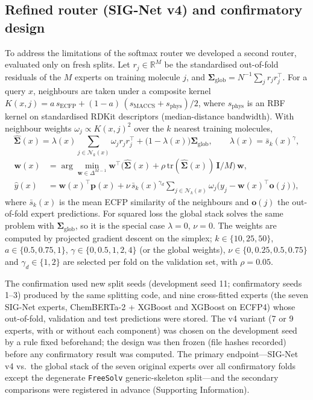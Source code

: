 \documentclass[journal=jcisd8,manuscript=article]{achemso}
\begin{document}
\subsection{Refined router (SIG-Net v4) and confirmatory design}
To address the limitations of the softmax router we developed a second router, evaluated only on fresh splits. Let $r_j \in \mathbb{R}^M$ be the standardised out-of-fold residuals of the $M$ experts on training molecule $j$, and $\boldsymbol{\Sigma}_{\mathrm{glob}} = N^{-1}\sum_j r_j r_j^\top$. For a query $x$, neighbours are taken under a composite kernel $K(x,j) = a\,s_{\mathrm{ECFP}} + (1-a)\,(s_{\mathrm{MACCS}} + s_{\mathrm{phys}})/2$, where $s_{\mathrm{phys}}$ is an RBF kernel on standardised RDKit descriptors (median-distance bandwidth). With neighbour weights $\omega_j \propto K(x,j)^2$ over the $k$ nearest training molecules,
\begin{equation}
\hat{\boldsymbol{\Sigma}}(x) = \lambda(x)\sum_{j \in \mathcal{N}_k(x)} \omega_j r_j r_j^\top + \bigl(1-\lambda(x)\bigr)\boldsymbol{\Sigma}_{\mathrm{glob}}, \qquad \lambda(x) = \bar{s}_k(x)^{\gamma},
\end{equation}
\begin{equation}
\begin{aligned}
\mathbf{w}(x) &= \arg\min_{\mathbf{w} \in \Delta^{M-1}} \mathbf{w}^\top \bigl(\hat{\boldsymbol{\Sigma}}(x) + \rho\,\mathrm{tr}(\hat{\boldsymbol{\Sigma}}(x))\,\mathbf{I}/M\bigr)\,\mathbf{w}, \\
\hat{y}(x) &= \mathbf{w}(x)^\top \mathbf{p}(x) + \nu\,\bar{s}_k(x)^{\gamma_d} \sum_{j \in \mathcal{N}_k(x)} \omega_j \bigl(y_j - \mathbf{w}(x)^\top \mathbf{o}(j)\bigr),
\end{aligned}
\end{equation}
where $\bar{s}_k(x)$ is the mean ECFP similarity of the neighbours and $\mathbf{o}(j)$ the out-of-fold expert predictions. For squared loss the global stack solves the same problem with $\boldsymbol{\Sigma}_{\mathrm{glob}}$, so it is the special case $\lambda = 0$, $\nu = 0$. The weights are computed by projected gradient descent on the simplex; $k \in \{10, 25, 50\}$, $a \in \{0.5, 0.75, 1\}$, $\gamma \in \{0, 0.5, 1, 2, 4\}$ (or the global weights), $\nu \in \{0, 0.25, 0.5, 0.75\}$ and $\gamma_d \in \{1, 2\}$ are selected per fold on the validation set, with $\rho = 0.05$.

The confirmation used new split seeds (development seed 11; confirmatory seeds 1--3) produced by the same splitting code, and nine cross-fitted experts (the seven SIG-Net experts, ChemBERTa-2 + XGBoost and XGBoost on ECFP4) whose out-of-fold, validation and test predictions were stored. The v4 variant (7 or 9 experts, with or without each component) was chosen on the development seed by a rule fixed beforehand; the design was then frozen (file hashes recorded) before any confirmatory result was computed. The primary endpoint---SIG-Net v4 vs.\ the global stack of the seven original experts over all confirmatory folds except the degenerate \texttt{FreeSolv} generic-skeleton split---and the secondary comparisons were registered in advance (Supporting Information).
\end{document}
